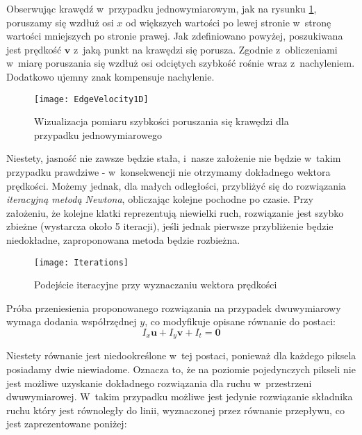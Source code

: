    \newpage
    Obserwując krawędź w~przypadku jednowymiarowym, jak na rysunku \ref{fig:EdgeVelocity1D}, poruszamy się wzdłuż osi $x$ od większych wartości po lewej stronie w~stronę wartości mniejszych po stronie prawej. Jak zdefiniowano powyżej, poszukiwana jest prędkość $\mathbf{v}$ z~jaką punkt na krawędzi się porusza. Zgodnie z~obliczeniami w~miarę poruszania się wzdłuż osi odciętych szybkość rośnie wraz z~nachyleniem. Dodatkowo ujemny znak kompensuje nachylenie.

    \begin{figure}[!ht]
      \centering
      \texttt{[image: EdgeVelocity1D]}
      \caption[Wizualizacja pomiaru szybkości poruszania się krawędzi dla przypadku jednowymiarowego]{Wizualizacja pomiaru szybkości poruszania się krawędzi dla przypadku jednowymiarowego}
      \label{fig:EdgeVelocity1D}
    \end{figure}

    Niestety, jasność nie zawsze będzie stała, i~nasze założenie nie będzie w~takim przypadku prawdziwe - w~konsekwencji nie otrzymamy dokładnego wektora prędkości. Możemy jednak, dla małych odległości, przybliżyć się do rozwiązania \textit{iteracyjną metodą Newtona}, obliczając kolejne pochodne po czasie. Przy założeniu, że kolejne klatki reprezentują niewielki ruch, rozwiązanie jest szybko zbieżne (wystarcza około 5 iteracji), jeśli jednak pierwsze przybliżenie będzie niedokładne, zaproponowana metoda będzie rozbieżna.

    \begin{figure}[!ht]
      \centering
      \texttt{[image: Iterations]}
      \caption[Podejście iteracyjne przy wyznaczaniu wektora prędkości]{Podejście iteracyjne przy wyznaczaniu wektora prędkości}
      \label{fig:Iterations}
    \end{figure}

    Próba przeniesienia proponowanego rozwiązania na przypadek dwuwymiarowy wymaga dodania współrzędnej $y$, co modyfikuje opisane równanie do postaci: \[I_{x}\mathbf{u} + I_{y}\mathbf{v} + I_{t} = \mathbf{0} \]

    Niestety równanie jest niedookreślone w~tej postaci, ponieważ dla każdego piksela posiadamy dwie niewiadome. Oznacza to, że na poziomie pojedynczych pikseli nie jest możliwe uzyskanie dokładnego rozwiązania dla ruchu w~przestrzeni dwuwymiarowej. W~takim przypadku możliwe jest jedynie rozwiązanie składnika ruchu który jest równoległy do linii, wyznaczonej przez równanie przepływu, co jest zaprezentowane poniżej:

